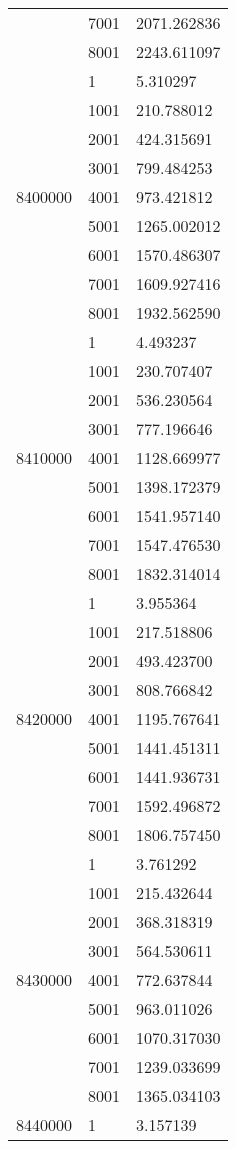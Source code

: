 \begin{table}[htb!]
\begin{tabular}{lll}
 & 7001 & 2071.262836 \\
 & 8001 & 2243.611097 \\
\multirow[c]{9}{*}{8400000} & 1 & 5.310297 \\
 & 1001 & 210.788012 \\
 & 2001 & 424.315691 \\
 & 3001 & 799.484253 \\
 & 4001 & 973.421812 \\
 & 5001 & 1265.002012 \\
 & 6001 & 1570.486307 \\
 & 7001 & 1609.927416 \\
 & 8001 & 1932.562590 \\
\multirow[c]{9}{*}{8410000} & 1 & 4.493237 \\
 & 1001 & 230.707407 \\
 & 2001 & 536.230564 \\
 & 3001 & 777.196646 \\
 & 4001 & 1128.669977 \\
 & 5001 & 1398.172379 \\
 & 6001 & 1541.957140 \\
 & 7001 & 1547.476530 \\
 & 8001 & 1832.314014 \\
\multirow[c]{9}{*}{8420000} & 1 & 3.955364 \\
 & 1001 & 217.518806 \\
 & 2001 & 493.423700 \\
 & 3001 & 808.766842 \\
 & 4001 & 1195.767641 \\
 & 5001 & 1441.451311 \\
 & 6001 & 1441.936731 \\
 & 7001 & 1592.496872 \\
 & 8001 & 1806.757450 \\
\multirow[c]{9}{*}{8430000} & 1 & 3.761292 \\
 & 1001 & 215.432644 \\
 & 2001 & 368.318319 \\
 & 3001 & 564.530611 \\
 & 4001 & 772.637844 \\
 & 5001 & 963.011026 \\
 & 6001 & 1070.317030 \\
 & 7001 & 1239.033699 \\
 & 8001 & 1365.034103 \\
\multirow[c]{9}{*}{8440000} & 1 & 3.157139 \\

\end{tabular}
\end{table}
